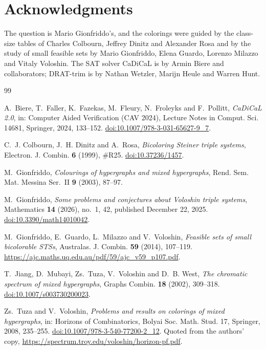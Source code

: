 \documentclass[11pt]{article}
\theoremstyle{definition}
\begin{document}
\section*{Acknowledgments}
The question is Mario Gionfriddo's, and the colorings were guided by the
class-size tables of Charles Colbourn, Jeffrey Dinitz and Alexander Rosa
and by the study of small feasible sets by Mario Gionfriddo, Elena Guardo,
Lorenzo Milazzo and Vitaly Voloshin. The SAT solver CaDiCaL is by Armin
Biere and collaborators; DRAT-trim is by Nathan Wetzler, Marijn Heule and
Warren Hunt.

\begin{thebibliography}{99}

A.~Biere, T.~Faller, K.~Fazekas, M.~Fleury, N.~Froleyks and F.~Pollitt,
\emph{CaDiCaL 2.0}, in: Computer Aided Verification (CAV 2024), Lecture
Notes in Comput. Sci. 14681, Springer, 2024, 133--152.
\href{https://doi.org/10.1007/978-3-031-65627-9_7}{doi:10.1007/978-3-031-65627-9\_7}.

C.~J. Colbourn, J.~H. Dinitz and A.~Rosa, \emph{Bicoloring Steiner triple
systems}, Electron. J. Combin. \textbf{6} (1999), \#R25.
\href{https://doi.org/10.37236/1457}{doi:10.37236/1457}.

M.~Gionfriddo, \emph{Colourings of hypergraphs and mixed hypergraphs},
Rend. Sem. Mat. Messina Ser.~II \textbf{9} (2003), 87--97.

M.~Gionfriddo, \emph{Some problems and conjectures about Voloshin triple
systems}, Mathematics \textbf{14} (2026), no.~1, 42, published
December 22, 2025.
\href{https://doi.org/10.3390/math14010042}{doi:10.3390/math14010042}.

M.~Gionfriddo, E.~Guardo, L.~Milazzo and V.~Voloshin, \emph{Feasible sets
of small bicolorable STSs}, Australas. J. Combin. \textbf{59} (2014),
107--119.
\url{https://ajc.maths.uq.edu.au/pdf/59/ajc_v59_p107.pdf}.

T.~Jiang, D.~Mubayi, Zs.~Tuza, V.~Voloshin and D.~B. West, \emph{The
chromatic spectrum of mixed hypergraphs}, Graphs Combin. \textbf{18}
(2002), 309--318.
\href{https://doi.org/10.1007/s003730200023}{doi:10.1007/s003730200023}.

Zs.~Tuza and V.~Voloshin, \emph{Problems and results on colorings of
mixed hypergraphs}, in: Horizons of Combinatorics, Bolyai Soc. Math.
Stud. 17, Springer, 2008, 235--255.
\href{https://doi.org/10.1007/978-3-540-77200-2_12}{doi:10.1007/978-3-540-77200-2\_12}.
Quoted from the authors' copy,
\url{https://spectrum.troy.edu/voloshin/horizon-pf.pdf}.


\end{thebibliography}
\end{document}
